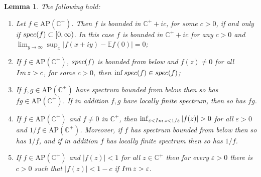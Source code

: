 \documentclass[a4paper,reqno,12pt]{amsart}
\newtheorem{lemma}[theorem]{Lemma}
\newcommand{\E}{\mathcal{E}}
\renewcommand{\H}{\mathbb{C}^+}
\newcommand{\im}{{\rm Im}\,}
\newcommand{\ep}{\varepsilon}
\newcommand{\1}{{\bf 1}}
\newcommand{\apc}{\mathrm{AP}(\H)}
\renewcommand{\E}{\mathbb{E}}
\renewcommand{\1}{{\bo 1}}
\newcommand{\spec}{{\rm spec}}
\begin{document}
\begin{lemma}\label{lem:fdisc}
The following hold:
\begin{enumerate}
\item[(i)] Let $f\in \apc$. Then $f$ is bounded in $\H +ic$, for some $c>0$, if and only if $\spec(f)\subset [0,\infty)$. In this case $f$ is bounded in $\H +ic$ for any $c>0$ and $\lim_{y\to \infty} \sup_x |f(x+iy)-\E f(0)|=0$;
\item[(ii)] If $f\in\apc$, $\spec(f)$ is bounded from below and $f(z)\neq 0$ for all $\im z>c$, for some $c>0$, then $\inf \spec(f)\in \spec(f)$;
\item[(iii)] If $f,g\in\apc$ have spectrum bounded from below  then so has $fg\in \apc$. If in addition $f,g$ have locally finite spectrum, then so has $fg$.
\item[(iv)] If  $f\in \apc$ and $f\neq 0$ in $\H$, then $\inf_{\ep < \im z <1/\ep} |f(z)|>0$ for all $\ep>0$ and $1/f\in \apc$. Moreover, if $f$ has spectrum bounded from below  then so has $1/f$, and if in addition $f$ has locally finite spectrum then so has $1/f$. 
\item[(v)] If $f\in \apc$ and $|f(z)|<1$ for all $z\in \H$ then for every $\ep>0$ there is $c>0$ such that $|f(z)|<1-c$ if $\im z>\ep$.
\end{enumerate}
\end{lemma}
\end{document}
